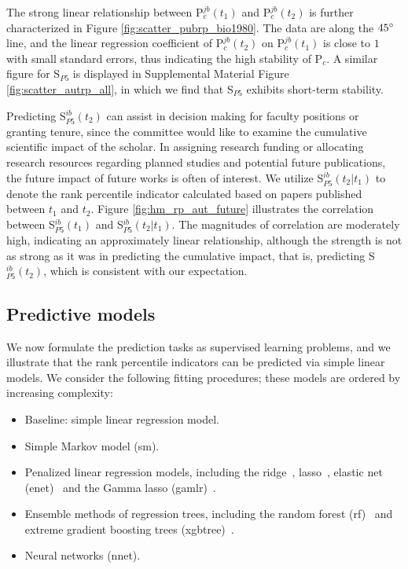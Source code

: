 The strong linear relationship between P$_{c}^{jb}(t_1)$ and P$_c^{jb}(t_2)$ is further characterized in Figure \ref{fig:scatter_pubrp_bio1980}. The data are along the $45 \degree$ line, and the linear regression coefficient of P$_c^{jb}(t_2)$ on P$_c^{jb}(t_1)$ is close to $1$ with small standard errors, thus indicating the high stability of P$_c$. A similar figure for S$_{P5}$ is displayed in Supplemental Material Figure \ref{fig:scatter_autrp_all}, in which we find that S$_{P5}$ exhibits short-term stability.

Predicting S$_{P5}^{ib}(t_2)$ can assist in decision making for faculty positions or granting tenure, since the committee would like to examine the cumulative scientific impact of the scholar. In assigning research funding or allocating research resources regarding planned studies and potential future publications, the future impact of future works is often of interest. We utilize S$_{P5}^{ib}(t_2|t_1)$ to denote the rank percentile indicator calculated based on papers published between $t_1$ and $t_2$. Figure \ref{fig:hm_rp_aut_future} illustrates the correlation between S$_{P5}^{ib}(t_1)$ and S$_{P5}^{ib}(t_2|t_1)$. The magnitudes of correlation are moderately high, indicating an approximately linear relationship, although the strength is not as strong as it was in predicting the cumulative impact, that is, predicting S$_{P5}^{ib}(t_2)$, which is consistent with our expectation.

\subsection*{Predictive models}
We now formulate the prediction tasks as supervised learning problems, and we illustrate that the rank percentile indicators can be predicted via simple linear models. We consider the following fitting procedures; these models are ordered by increasing complexity:
\begin{itemize}
    \item Baseline: simple linear regression model.
    \item Simple Markov model (sm).
    \item Penalized linear regression models, including the ridge~\cite{hoerl1970ridge}, lasso~\cite{Tibshirani1996}, elastic net (enet)~\cite{zou2005regularization} and the Gamma lasso (gamlr)~\cite{Taddy2017}.
    \item Ensemble methods of regression trees, including the random forest (rf)~\cite{liaw2002classification} and extreme gradient boosting trees (xgbtree)~\cite{chen2016xgboost}.
    \item Neural networks (nnet).
\end{itemize}

